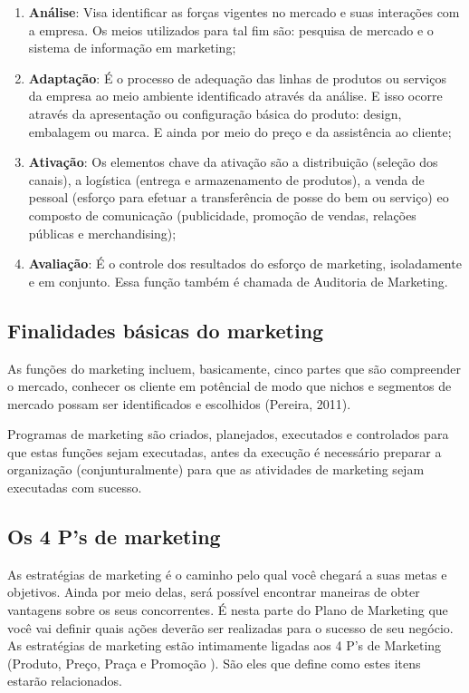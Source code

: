 \documentclass[
	12pt,				%
	openright,			%
	oneside,			%
	a4paper,			%
	english,			%
	french,				%
	spanish,			%
	brazil				%
	]{abntex2}
\begin{document}
	\begin{enumerate}
		\item \textbf{Análise}: Visa identificar as forças vigentes no mercado e suas interações com a empresa. Os meios utilizados para tal fim são: pesquisa de mercado e o sistema de informação em marketing;
		\item \textbf{Adaptação}: É o processo de adequação das linhas de produtos ou serviços da empresa ao meio ambiente identificado através da análise. E isso ocorre através da apresentação ou configuração básica do produto: design, embalagem ou marca. E ainda por meio do preço e da assistência ao cliente;
		\item \textbf{Ativação}: Os elementos chave da ativação são a distribuição (seleção dos canais), a logística (entrega e armazenamento de produtos), a venda de pessoal (esforço para efetuar a transferência de posse do bem ou serviço) eo composto de comunicação (publicidade, promoção de vendas, relações públicas e merchandising);
		\item \textbf{Avaliação}: É o controle dos resultados do esforço de marketing, isoladamente e em conjunto. Essa função também é chamada de Auditoria de Marketing.
	\end{enumerate}

\subsection[Finalidades básicas do marketing]{Finalidades básicas do marketing}
	
	As funções do marketing incluem, basicamente, cinco partes que são compreender o mercado, conhecer os cliente em potêncial de modo que nichos e segmentos de mercado possam ser identificados e escolhidos (Pereira, 2011).
	
	Programas de marketing são criados, planejados, executados e controlados para que estas funções sejam executadas, antes da execução é necessário preparar a organização (conjunturalmente) para que as atividades de marketing sejam executadas com sucesso.
	
\subsection[Os 4 P's de marketing]{Os 4 P's de marketing}

	As estratégias de marketing é o caminho pelo qual você chegará a suas metas e objetivos. Ainda por meio delas, será possível encontrar maneiras de obter vantagens sobre os seus concorrentes. É nesta parte do Plano de Marketing que você vai definir quais ações deverão ser realizadas para o sucesso de seu negócio. As estratégias de marketing estão intimamente ligadas aos 4 P’s de Marketing (Produto, Preço, Praça e Promoção ). São eles que define como estes itens estarão relacionados.
\end{document}
